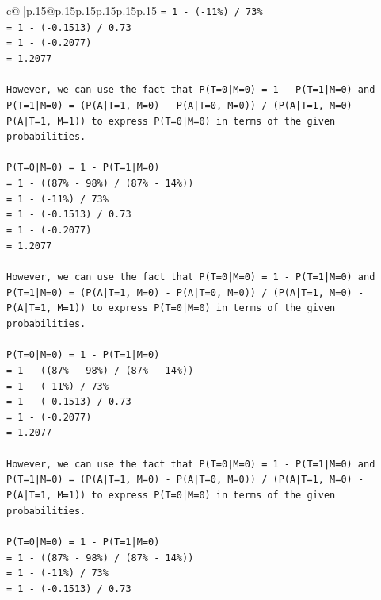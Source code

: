 \documentclass{article}
\begin{document}
{\begin{supertabular}{c@{$\;$}|p{.15\linewidth}@{}p{.15\linewidth}p{.15\linewidth}p{.15\linewidth}p{.15\linewidth}p{.15\linewidth}}
{{{\texttt{= 1 {-} ({-}11\%) / 73\%} \\
\texttt{= 1 {-} ({-}0.1513) / 0.73} \\
\texttt{= 1 {-} ({-}0.2077)} \\
\texttt{= 1.2077} \\
\\ 
\texttt{However, we can use the fact that P(T=0|M=0) = 1 {-} P(T=1|M=0) and P(T=1|M=0) = (P(A|T=1, M=0) {-} P(A|T=0, M=0)) / (P(A|T=1, M=0) {-} P(A|T=1, M=1)) to express P(T=0|M=0) in terms of the given probabilities.} \\
\\ 
\texttt{P(T=0|M=0) = 1 {-} P(T=1|M=0)} \\
\texttt{= 1 {-} ((87\% {-} 98\%) / (87\% {-} 14\%))} \\
\texttt{= 1 {-} ({-}11\%) / 73\%} \\
\texttt{= 1 {-} ({-}0.1513) / 0.73} \\
\texttt{= 1 {-} ({-}0.2077)} \\
\texttt{= 1.2077} \\
\\ 
\texttt{However, we can use the fact that P(T=0|M=0) = 1 {-} P(T=1|M=0) and P(T=1|M=0) = (P(A|T=1, M=0) {-} P(A|T=0, M=0)) / (P(A|T=1, M=0) {-} P(A|T=1, M=1)) to express P(T=0|M=0) in terms of the given probabilities.} \\
\\ 
\texttt{P(T=0|M=0) = 1 {-} P(T=1|M=0)} \\
\texttt{= 1 {-} ((87\% {-} 98\%) / (87\% {-} 14\%))} \\
\texttt{= 1 {-} ({-}11\%) / 73\%} \\
\texttt{= 1 {-} ({-}0.1513) / 0.73} \\
\texttt{= 1 {-} ({-}0.2077)} \\
\texttt{= 1.2077} \\
\\ 
\texttt{However, we can use the fact that P(T=0|M=0) = 1 {-} P(T=1|M=0) and P(T=1|M=0) = (P(A|T=1, M=0) {-} P(A|T=0, M=0)) / (P(A|T=1, M=0) {-} P(A|T=1, M=1)) to express P(T=0|M=0) in terms of the given probabilities.} \\
\\ 
\texttt{P(T=0|M=0) = 1 {-} P(T=1|M=0)} \\
\texttt{= 1 {-} ((87\% {-} 98\%) / (87\% {-} 14\%))} \\
\texttt{= 1 {-} ({-}11\%) / 73\%} \\
\texttt{= 1 {-} ({-}0.1513) / 0.73} \\
}}}
\end{supertabular}}
\end{document}
